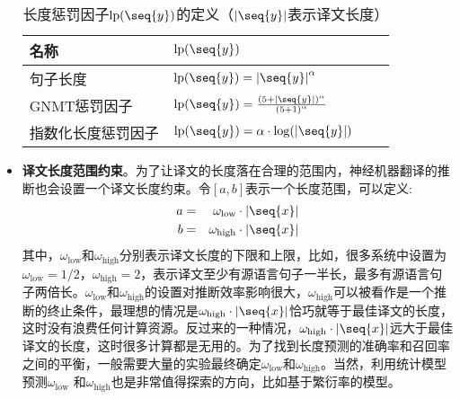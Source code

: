 \begin{itemize}
\begin{table}[htp]
\centering
\caption{长度惩罚因子$\textrm{lp}(\seq{y})$的定义（$|\seq{y}|$表示译文长度）}
\label{tab:14-1}
\small
\begin{tabular}{l | l l l}
\rule{0pt}{15pt}     名称 & $\textrm{lp}(\seq{y})$  \\
\hline
\rule{0pt}{15pt}     句子长度 &  $\textrm{lp}(\seq{y}) = {\vert\seq{y}\vert}^{\alpha}$ \\
\rule{0pt}{15pt}     GNMT惩罚因子 &  $\textrm{lp}(\seq{y}) = \frac{{(5+\vert\seq{y}\vert)}^{\alpha}}{{(5+1)}^{\alpha}}$ \\
\rule{0pt}{15pt}     指数化长度惩罚因子 &  $\textrm{lp}(\seq{y}) = \alpha \cdot \log(\vert\seq{y}\vert)$ \\
\end{tabular}
\end{table}
\vspace{0.5em}
\item {\small\sffamily\bfseries{译文长度范围约束}}。为了让译文的长度落在合理的范围内，神经机器翻译的推断也会设置一个译文长度约束。令$[a,b]$表示一个长度范围，可以定义:
\begin{eqnarray}
a &=& \omega_{\textrm{low}}\cdot |\seq{x}| \label{eq:14-3}\\
b &=& \omega_{\textrm{high}}\cdot |\seq{x}| \label{eq:14-4}
\end{eqnarray}
\vspace{0.5em}
\noindent 其中，$\omega_{\textrm{low}}$和$\omega_{\textrm{high}}$分别表示译文长度的下限和上限，比如，很多系统中设置为$\omega_{\textrm{low}}=1/2$，$\omega_{\textrm{high}}=2$，表示译文至少有源语言句子一半长，最多有源语言句子两倍长。$\omega_{\textrm{low}}$和$\omega_{\textrm{high}}$的设置对推断效率影响很大，$\omega_{\textrm{high}}$可以被看作是一个推断的终止条件，最理想的情况是$\omega_{\textrm{high}} \cdot |\seq{x}|$恰巧就等于最佳译文的长度，这时没有浪费任何计算资源。反过来的一种情况，$\omega_{\textrm{high}} \cdot |\seq{x}|$远大于最佳译文的长度，这时很多计算都是无用的。为了找到长度预测的准确率和召回率之间的平衡，一般需要大量的实验最终确定$\omega_{\textrm{low}}$和$\omega_{\textrm{high}}$。当然，利用统计模型预测$\omega_{\textrm{low}}$ 和$\omega_{\textrm{high}}$也是非常值得探索的方向，比如基于繁衍率的模型。
\vspace{0.5em}

\end{itemize}
